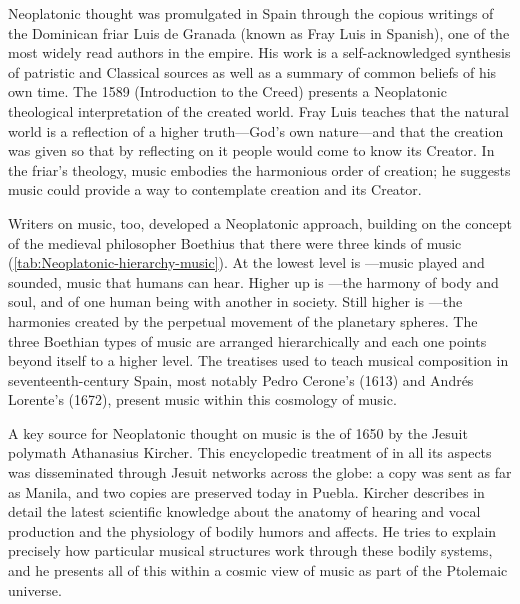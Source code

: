 Neoplatonic thought was promulgated in Spain through the copious writings of
the Dominican friar Luis de Granada (known as Fray Luis in Spanish), one of the
most widely read authors in the empire.%
    \Autocite{Weber:ReligiousLitSpain}
His work is a self-acknowledged synthesis of patristic and Classical
sources as well as a summary of common beliefs of his own time.
The 1589  (Introduction to the Creed)
presents a Neoplatonic theological interpretation of the created world.%
    \Autocites
    {LuisdeGranada-Balcells:SimboloPtI}
    {LuisdeGranada:Simbolo}
Fray Luis teaches that the natural world is a reflection of a higher
truth---God's own nature---and that the creation was given so that by
reflecting on it people would come to know its Creator.
In the friar's theology, music embodies the harmonious order of creation; he
suggests music could provide a way to contemplate creation and its
Creator.

Writers on music, too, developed a Neoplatonic approach, building on the
concept of the medieval philosopher Boethius that there were three kinds of
music (\cref{tab:Neoplatonic-hierarchy-music}).%
    \Autocite{Boethius:Musica}
At the lowest level is ---music played and sounded,
music that humans can hear.
Higher up is ---the harmony of body and soul, and of one
human being with another in society.
Still higher is ---the harmonies created by the perpetual
movement of the planetary spheres.
The three Boethian types of music are arranged hierarchically and each one
points beyond itself to a higher level.
The treatises used to teach musical composition in seventeenth-century Spain,
most notably Pedro Cerone's  (1613) and Andrés
Lorente's  (1672), present music within this
cosmology of music.

A key source for Neoplatonic thought on music is the  of 1650 by the Jesuit polymath Athanasius Kircher.%
\Autocite{Kircher:Musurgia}
This encyclopedic treatment of  in all its aspects
was disseminated through Jesuit networks across the globe: a copy was sent as
far as Manila, and two copies are preserved today in Puebla.%
    \Autocites
    {Findlen:Kircher}
    {Godwin:KircherTheater}
    [48--50]{Irving:Colonial}
Kircher describes in detail the latest scientific knowledge about the anatomy
of hearing and vocal production and the physiology of bodily humors and
affects. 
He tries to explain precisely how particular musical structures
work through these bodily systems, and he presents all of this within a cosmic
view of music as part of the Ptolemaic universe.

